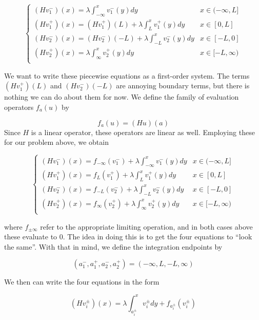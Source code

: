 \documentclass[12pt]{article}
\begin{document}
\begin{equation}
\begin{cases}
(Hv_1^-)(x) = \lambda \int_{-\infty}^x v_1^-(y) dy & x \in (-\infty, L] \\
(Hv_1^+)(x) = (Hv_1^+)(L) + \lambda \int_{L}^x v_1^+(y) dy & x \in [0, L] \\
(Hv_2^-)(x) = (Hv_2^-)(-L) + \lambda \int_{-L}^x v_2^-(y) dy & x \in [-L, 0] \\ 
(Hv_2^+)(x) = \lambda \int_{\infty}^x v_2^+(y) dy & x \in [-L, \infty) \\ 
\end{cases}
\end{equation}

We want to write these piecewise equations as a first-order system. The terms $(Hv_1^+)(L)$ and $(Hv_2^-)(-L)$ are annoying boundary terms, but there is nothing we can do about them for now. We define the family of evaluation operators $f_a(u)$ by

\[
f_a(u) = (Hu)(a)
\]
Since $H$ is a linear operator, these operators are linear as well. Employing these for our problem above, we obtain

\begin{equation}
\begin{cases}
(Hv_1^-)(x) = f_{-\infty}(v_1^-) + \lambda \int_{-\infty}^x v_1^-(y) dy & x \in (-\infty, L] \\
(Hv_1^+)(x) = f_L(v_1^+) + \lambda \int_{L}^x v_1^+(y) dy & x \in [0, L] \\
(Hv_2^-)(x) = f_{-L}(v_2^-) + \lambda \int_{-L}^x v_2^-(y) dy & x \in [-L, 0] \\ 
(Hv_2^+)(x) = f_{\infty}(v_2^+) + \lambda \int_{\infty}^x v_2^+(y) dy & x \in [-L, \infty) \\ 
\end{cases}
\end{equation}

where $f_{\pm \infty}$ refer to the appropriate limiting operation, and in both cases above these evaluate to 0. The idea in doing this is to get the four equations to ``look the same''. With that in mind, we define the integration endpoints by

\[
(a_1^-, a_1^+, a_2^-, a_2^+) = (-\infty, L, -L, \infty)
\]

We then can write the four equations in the form

\begin{equation}
(Hv_i^\pm)(x) = \lambda \int_{a_i^\pm}^x v_i^{\pm} dy + f_{a_i^\pm}(v_i^\pm)
\end{equation}
\end{document}
